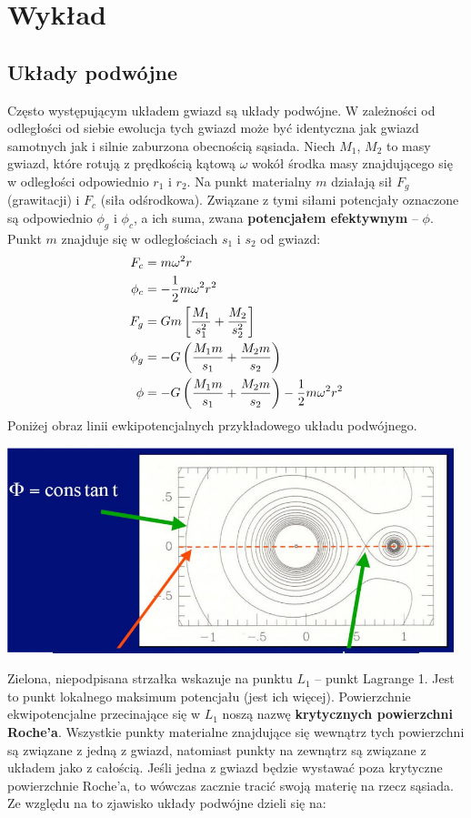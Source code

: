 \documentclass[../index.tex]{subfiles}
\begin{document}
    \section{Wykład}
        \subsection{Układy podwójne}
            Często występującym układem gwiazd są układy podwójne. W zależności od odległości od siebie ewolucja tych gwiazd może być identyczna jak gwiazd samotnych jak i silnie zaburzona obecnością sąsiada. Niech \(M_1\), \(M_2\) to masy gwiazd, które rotują z prędkością kątową \(\omega\) wokół środka masy znajdującego się w odległości odpowiednio \(r_1\) i \(r_2\). Na punkt materialny \(m\) działają sił \(F_g\) (grawitacji) i \(F_c\) (siła odśrodkowa). Związane z tymi siłami potencjały oznaczone są odpowiednio \(\phi_g\) i \(\phi_c\), a ich suma, zwana \textbf{potencjałem efektywnym} – \(\phi\). Punkt \(m\) znajduje się w odległościach \(s_1\) i \(s_2\) od gwiazd:
            \begin{align}
                F_c &=  m\omega^2 r\\
                \phi_c &=  - \frac{1}{2}m\omega^2  r^2 \\
                F_g &=  Gm\left[\frac{M_1}{s_1^2 } +\frac{M_2}{s_2^2 } \right]\\
                \phi_g &= - G \left(\frac{M_1m}{s_1} + \frac{M_2m}{s_2}  \right) \\
                \phi &=  - G\left(\frac{M_1m}{s_1} +\frac{M_2m}{s_2}  \right) - \frac{1}{2}m\omega^2 r^2 
            \end{align}
            Poniżej obraz linii ewkipotencjalnych przykładowego układu podwójnego. 
            \begin{center}
                \includegraphics[width=13cm]{images/ukladPodwojnyPotencjal.png}
            \end{center}
            Zielona, niepodpisana strzałka wskazuje na punktu \(L_1\) – punkt Lagrange 1. Jest to punkt lokalnego maksimum potencjału (jest ich więcej). Powierzchnie ekwipotencjalne przecinające się w \(L_1\) noszą nazwę \textbf{krytycznych powierzchni Roche'a}. Wszystkie punkty materialne znajdujące się wewnątrz tych powierzchni są związane z jedną z gwiazd, natomiast punkty na zewnątrz są związane z układem jako z całością. Jeśli jedna z gwiazd będzie wystawać poza krytyczne powierzchnie Roche'a, to wówczas zacznie tracić swoją materię na rzecz sąsiada. Ze względu na to zjawisko układy podwójne dzieli się na:
\end{document}
